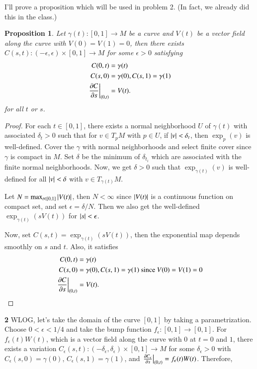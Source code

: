 \documentclass[a4paper, 12pt]{article}
\theoremstyle{Mydefinition}
\theoremstyle{Mytheorem}
\newtheorem{proposition}[statement]{Proposition}
\begin{document}
I'll prove a proposition which will be used in problem 2. (In fact, we already did this in the class.)
\begin{proposition}
Let $\gamma(t):[0,1]\rightarrow M$ be a curve and $V(t)$ be a vector field along the curve with $V(0)=V(1)=0$, then there exists $C(s,t):(-\epsilon, \epsilon)\times[0,1]\rightarrow M$ for some $\epsilon>0$ satisfying
\begin{equation}
    \begin{split}
        C(0,t)&=\gamma(t)\\
        C(s,0)&=\gamma(0), C(s,1)=\gamma(1)\\
        \left.\pdv{C}{s}\right|_{(0,t)} &= V(t).
    \end{split}
\end{equation}
for all $t$ or $s$.
\end{proposition}
\begin{proof}
For each $t\in[0,1]$, there exists a normal neighborhood $U$ of $\gamma(t)$ with associated $\delta_t>0$ such that for $v\in T_{p}M$ with $p\in U$, if $\abs{v}<\delta_t$, then $\exp_p(v)$ is well-defined. Cover the $\gamma$ with normal neighborhoods and select finite cover since $\gamma$ is compact in $M$. Set $\delta$ be the minimum of $\delta_{t_i}$ which are associated with the finite normal neighborhoods. Now, we get $\delta>0$ such that $\exp_{\gamma(t)}(v)$ is well-defined for all $\abs{v}<\delta$ with $v\in T_{\gamma(t)}M$.

Let $N=\max_{t\in[0,1]}\abs{V(t)}$, then $N<\infty$ since $\abs{V(t)}$ is a continuous function on compact set, and set $\epsilon = \delta/N$. Then we also get the well-defined $\exp_{\gamma(t)}(sV(t))$ for $\abs{s}<\epsilon$.

Now, set $C(s,t) = \exp_{\gamma(t)}(sV(t))$, then the exponential map depends smoothly on $s$ and $t$. Also, it satisfies
\begin{equation}
    \begin{split}
        C(0,t)&=\gamma(t)\\
        C(s,0)&=\gamma(0), C(s,1)=\gamma(1) \textrm{ since }V(0)=V(1)=0\\
        \left.\pdv{C}{s}\right|_{(0,t)} &= V(t).
    \end{split}
\end{equation}
\end{proof}
\noindent \textbf{2}
WLOG, let's take the domain of the curve $[0,1]$ by taking a parametrization. Choose $0<\epsilon<1/4$ and take the bump function $f_\epsilon:[0,1]\rightarrow [0,1]$. For $f_\epsilon(t)W(t)$, which is a vector field along the curve with $0$ at $t=0$ and $1$, there exists a variation $C_\epsilon(s,t):(-\delta_\epsilon, \delta_\epsilon)\times[0,1]\rightarrow M$ for some $\delta_\epsilon>0$ with  $C_\epsilon(s,0) = \gamma(0)$, $C_\epsilon(s,1) = \gamma(1)$, and $\left.\pdv{C_\epsilon}{s}\right|_{(0,t)} = f_\epsilon(t)W(t)$. Therefore,
\end{document}

